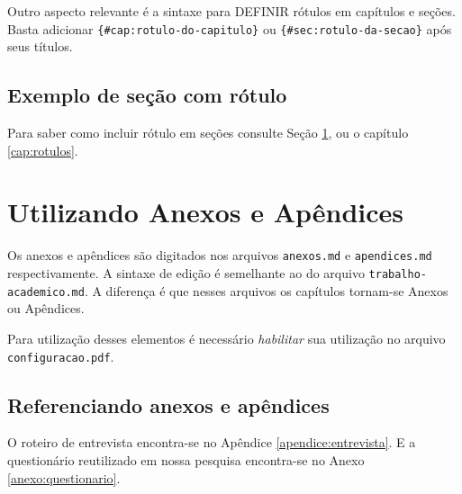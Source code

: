 \documentclass[
	12pt,				%
  openright,			%
	twoside,			%
	a4paper,			%
	english,			%
	french,				%
	spanish,			%
	brazil				%
	]{abntex2}
\begin{document}
Outro aspecto relevante é a sintaxe para DEFINIR rótulos em capítulos e
seções. Basta adicionar \texttt{\{\#cap:rotulo-do-capitulo\}} ou
\texttt{\{\#sec:rotulo-da-secao\}} após seus títulos.

\section{Exemplo de seção com rótulo}\label{sec:exemplo-de-rotulo}

Para saber como incluir rótulo em seções consulte Seção
\ref{sec:exemplo-de-rotulo}, ou o capítulo \ref{cap:rotulos}.

\chapter{Utilizando Anexos e
Apêndices}\label{utilizando-anexos-e-apuxeandices}

Os anexos e apêndices são digitados nos arquivos \texttt{anexos.md} e
\texttt{apendices.md} respectivamente. A sintaxe de edição é semelhante
ao do arquivo \texttt{trabalho-academico.md}. A diferença é que nesses
arquivos os capítulos tornam-se Anexos ou Apêndices.

Para utilização desses elementos é necessário \emph{habilitar} sua
utilização no arquivo \texttt{configuracao.pdf}.

\section{Referenciando anexos e
apêndices}\label{referenciando-anexos-e-apuxeandices}

O roteiro de entrevista encontra-se no Apêndice
\ref{apendice:entrevista}. E a questionário reutilizado em nossa
pesquisa encontra-se no Anexo \ref{anexo:questionario}.



\postextual

\postextual
\end{document}
